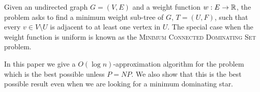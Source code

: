 Given an undirected graph $G = (V, E)$ and a weight function $w:E \to \mathbb{R}$, 
the \Problem{} problem asks to find a minimum weight sub-tree of $G$, 
$T = (U, F)$, such that every $v \in V \setminus U$ is adjacent to at least one 
vertex in $U$.
The special case when the weight function is uniform is known as the 
\textsc{Minimum Connected Dominating Set} problem. 

In this paper we give a $O(\log n)$-approximation algorithm for the problem
which is the best possible unless $P = NP$.
We also show that this is the best possible result even when we are looking for
a minimum dominating star.   
